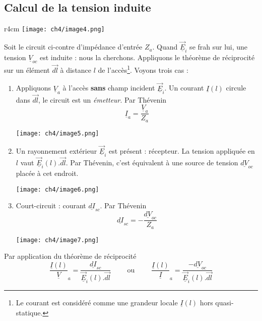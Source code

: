 	\subsection{Calcul de la tension induite}
	\begin{wrapfigure}[4]{r}{4cm}
	\vspace{-15mm}
	\texttt{[image: ch4/image4.png]}
	\end{wrapfigure}
	Soit le circuit ci-contre d'impédance d'entrée $Z_a$. Quand $\underline{\vec{E}}_i$ se frah 
	sur lui, une tension $\underline{V}_{oc}$ est induite : nous la cherchons. Appliquons le 
	théorème de réciprocité sur un élément $\vec{dl}$ à distance $l$ de l'accès\footnote{Le courant 
	est considéré comme une grandeur locale $\underline{I}(l)$ hors quasi-statique.}. Voyons 
	trois cas :
	\begin{enumerate}
	\item Appliquons $\underline{V}_a$ à l'accès \textbf{sans} champ incident $\underline{\vec{E}}_i$. 
	Un courant $\underline{I}(l)$ circule dans $\vec{dl}$, le circuit est un \textit{émetteur}. Par 
	Thévenin 
	\begin{equation}
	\underline{I}_a = \dfrac{\underline{V}_a}{Z_a}
	\end{equation}
		\begin{center}
	\texttt{[image: ch4/image5.png]}
	\end{center}
	\item Un rayonnement extérieur $\underline{\vec{E}}_i$ est présent : récepteur. La tension appliquée 
	en $l$ vaut $\underline{\vec{E}}_i(l).\vec{dl}$. Par Thévenin, c'est équivalent à une source de 
	tension $\underline{dV}_{oc}$ placée à cet endroit.
			\begin{center}
	\texttt{[image: ch4/image6.png]}
	\end{center}
	\item Court-circuit : courant $\underline{dI}_{sc}$. Par Thévenin
	\begin{equation}
	\underline{dI}_{sc} = -\dfrac{\underline{dV}_{oc}}{Z_a}
	\end{equation}
			\begin{center}
	\texttt{[image: ch4/image7.png]}
	\end{center}
	\end{enumerate}
	Par application du théorème de réciprocité
	\begin{equation}
	\dfrac{\underline{I}(l)}{\underline{V}}_a = \dfrac{\underline{dI}_{sc}}{\underline{\vec{E}}_i(l).
	\vec{dl}}\qquad\text{ ou }\qquad
	\dfrac{\underline{I}(l)}{\underline{I}}_a = \dfrac{-\underline{dV}_{oc}}{\underline{\vec{E}}_i(l).
	\vec{dl}}
	\end{equation}
